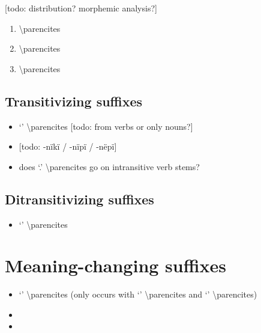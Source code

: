 \documentclass{memoir}
\begin{document}
{[}todo: distribution? morphemic analysis?{]}

\begin{enumerate}
\def\labelenumi{\arabic{enumi}.}
\tightlist
\item
   \textbackslash parencites
\item
   \textbackslash parencites
\item
   \textbackslash parencites
\end{enumerate}

\subsection{Transitivizing suffixes}

\begin{itemize}
\tightlist
\item
   `' \textbackslash parencites {[}todo: from verbs or
  only nouns?{]}
\item
  {[}todo: -nïkï / -nïpï / -nëpï{]}
\item
  does  `.' \textbackslash parencites go on
  intransitive verb stems?
\end{itemize}

\subsection{\texorpdfstring{Ditransitivizing suffixes
\label{sec:ditrz}}{Ditransitivizing suffixes }}

\begin{itemize}
\tightlist
\item
   `' \textbackslash parencites
\end{itemize}

\section{\texorpdfstring{Meaning-changing suffixes
\label{sec:meaningderiv}}{Meaning-changing suffixes }}

\begin{itemize}
\item
   `' \textbackslash parencites (only occurs with
   `' \textbackslash parencites and 
  `' \textbackslash parencites)
\item
\item
\end{itemize}
\end{document}
